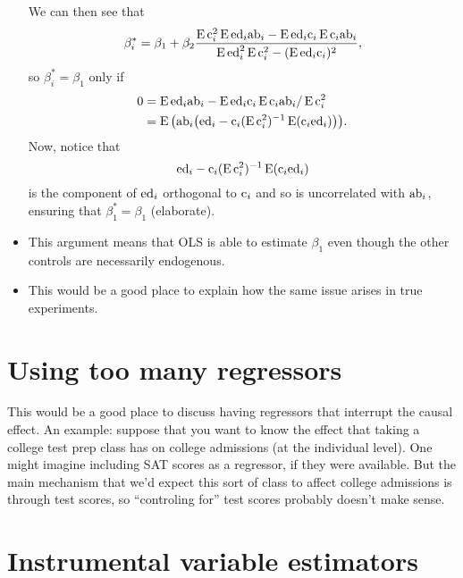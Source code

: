 \begin{itemize}[leftmargin=0pt]
  We can then see that
  \begin{equation*}
    \beta_i^* = \beta_1 + \beta_2 
    \frac{\E \co_i^2 \E \ed_i \ab_i - \E\ed_i \co_i \E \co_i \ab_i}%
    {\E \ed_i^2 \E \co_i^2 - (\E \ed_i \co_i)^2},
  \end{equation*}
  so $\beta_i^* = \beta_1$ only if
  \begin{align*}
    0
    &= \operatorname{E} \text{ed}_i \text{ab}_i - \operatorname{E}\text{ed}_i \text{c}_i \operatorname{E} \text{c}_i \text{ab}_i / \operatorname{E} \text{c}_i^2 \\
    &= \operatorname{E}\big( \text{ab}_i \big(\text{ed}_i - \text{c}_i (\operatorname{E} \text{c}_i^2)^{-1}\operatorname{E}(\text{c}_i
    \text{ed}_i) \big) \big).
  \end{align*}
  Now, notice that
  \begin{equation*}
    \text{ed}_i - \text{c}_i (\operatorname{E} \text{c}_i^2)^{-1}\operatorname{E}(\text{c}_i \text{ed}_i)
  \end{equation*}
  is the component of $\text{ed}_i$ orthogonal to $\text{c}_i$ and so is
  uncorrelated with $\text{ab}_i$, ensuring that $\beta_1^* = \beta_1$
  (elaborate).

\item This argument means that OLS is able to estimate $\beta_1$ even
  though the other controls are necessarily endogenous.

\item This would be a good place to explain how the same issue arises
  in true experiments.

\end{itemize}

\section{Using too many regressors}

This would be a good place to discuss having regressors that interrupt
the causal effect. An example: suppose that you want to know the
effect that taking a college test prep class has on college admissions
(at the individual level). One might imagine including SAT scores as a
regressor, if they were available. But the main mechanism that we'd
expect this sort of class to affect college admissions is through test
scores, so ``controling for'' test scores probably doesn't make sense.

\section{Instrumental variable estimators}

